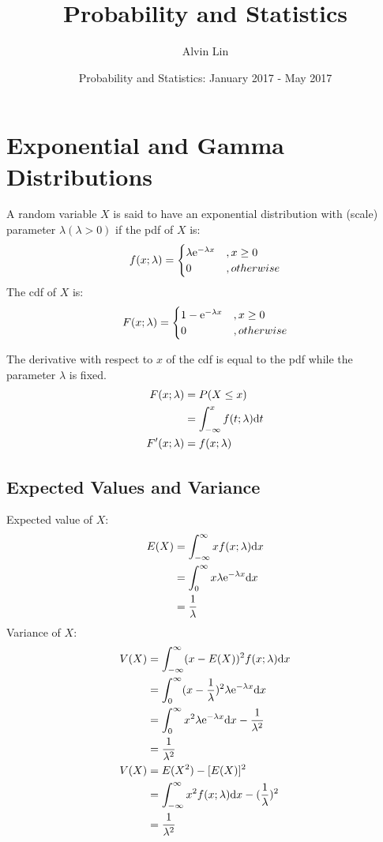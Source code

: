 \documentclass[letterpaper, 12pt]{math}
\title{Probability and Statistics}
\author{Alvin Lin}
\date{Probability and Statistics: January 2017 - May 2017}
\begin{document}
\maketitle

\section*{Exponential and Gamma Distributions}
A random variable \( X \) is said to have an exponential distribution with
(scale) parameter \( \lambda (\lambda>0) \) if the pdf of \( X \) is:
\[ f(x;\lambda) =
  \begin{cases}
    \lambda\mathrm{e}^{-\lambda x} &, x\geq 0 \\
    0 &, otherwise
  \end{cases}
\]
The cdf of \( X \) is:
\[ F(x;\lambda) =
  \begin{cases}
    1-\mathrm{e}^{-\lambda x} &, x\geq 0 \\
    0 &, otherwise
  \end{cases}
\]

The derivative with respect to \( x \) of the cdf is equal to the pdf while the
parameter \( \lambda \) is fixed.
\begin{align*}
  F(x;\lambda) &= P(X\leq x) \\
  &= \int_{-\infty}^{x}f(t;\lambda)\mathrm{d}{t} \\
  F'(x;\lambda) &= f(x;\lambda)
\end{align*}

\subsection*{Expected Values and Variance}
Expected value of \( X \):
\begin{align*}
  E(X) &= \int_{-\infty}^{\infty}xf(x;\lambda)\mathrm{d}{x} \\
  &= \int_{0}^{\infty}x\lambda\mathrm{e}^{-\lambda x}\mathrm{d}{x} \\
  &= \frac{1}{\lambda}
\end{align*}
Variance of \( X \):
\begin{align*}
  V(X) &= \int_{-\infty}^{\infty}(x-E(X))^{2}f(x;\lambda)\mathrm{d}{x} \\
  &= \int_{0}^{\infty}(x-\frac{1}{\lambda})^{2}\lambda\mathrm{e}^{-\lambda x}\mathrm{d}{x} \\
  &= \int_{0}^{\infty}x^{2}
    \lambda\mathrm{e}^{-\lambda x}\mathrm{d}{x}-\frac{1}{\lambda^{2}} \\
  &= \frac{1}{\lambda^{2}} \\
  V(X) &= E(X^{2})-[E(X)]^{2} \\
  &= \int_{-\infty}^{\infty}x^{2}f(x;\lambda)\mathrm{d}{x}-(\frac{1}{\lambda})^{2} \\
  &= \frac{1}{\lambda^{2}}
\end{align*}
\end{document}
